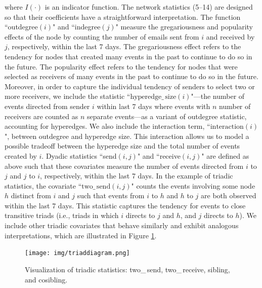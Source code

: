 \documentclass[ba]{imsart}
\numberwithin{equation}{section}
\theoremstyle{plain}
\begin{document}
	where $I(\cdot)$ is an indicator function. The network statistics (5--14) are designed so that their coefficients have a straightforward interpretation. The function ``outdegree$(i)$" and ``indegree$(j)$" measure the gregariousness and popularity effects of the node by counting the number of emails sent from $i$ and received by $j$, respectively, within the last 7 days. The gregariousness effect refers to the tendency for nodes that created many events in the past to continue to do so in the future. The popularity effect refers to the tendency for nodes that were selected as receivers of many events in the past to continue to do so in the future. Moreover, in order to capture the individual tendency of senders to select two or more receivers, we include the statistic ``$\mbox{hyperedge}\_\,\mbox{size}(i)$"---the number of events directed from sender $i$ within last 7 days where events with $n$ number of receivers are counted as $n$ separate events---as a variant of outdegree statistic, accounting for hyperedges. We also include the interaction term, ``$\mbox{interaction}(i)$", between outdegree and hyperedge size. This interaction allows us to model a possible tradeoff between the hyperedge size and the total number of events created by $i$. Dyadic statistics ``send$(i, j)$" and ``receive$(i, j)$" are defined as above such that these covariates measure the number of events directed from $i$ to $j$ and $j$ to $i$, respectively, within the last 7 days. In the example of triadic statistics, the covariate ``$\mbox{two}\_\,\mbox{send}(i, j)$" counts the events involving some node $h$ distinct from $i$ and $j$ such that events from $i$ to $h$ and $h$ to $j$ are both observed within the last 7 days. This statistic captures the tendency for events to close transitive triads (i.e., triads in which $i$ directs to $j$ and $h$, and $j$ directs to $h$). We include other triadic covariates that behave similarly and exhibit analogous interpretations, which are illustrated in Figure \ref{figure:netstats}.
	\begin{figure}[!t]
		\centering
		\texttt{[image: img/triaddiagram.png]}	
		\caption {Visualization of triadic statistics: two\_\,send, two\_\,receive, sibling, and cosibling.}
		\label{figure:netstats}
	\end{figure}
	
\end{document}
